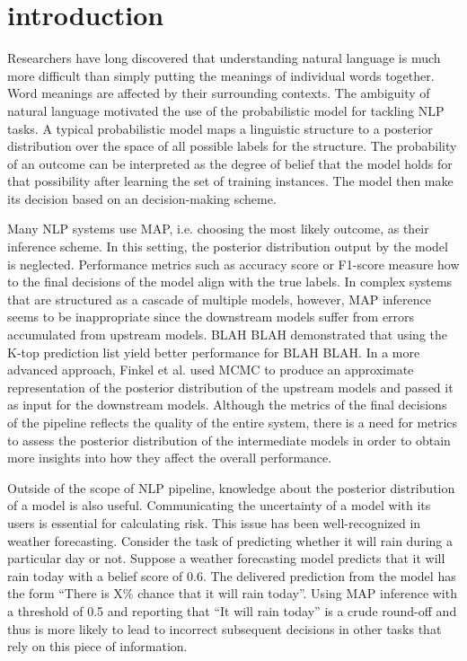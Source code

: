 \chapter{introduction}
\doublespacenormalsize
Researchers have long discovered that understanding natural language is much more difficult than simply putting the meanings of individual words together. Word meanings are affected by their surrounding contexts. The ambiguity of natural language motivated the use of the probabilistic model for tackling NLP tasks. A typical probabilistic model maps a linguistic structure to a posterior distribution over the space of all possible labels for the structure. The probability of an outcome can be interpreted as the degree of belief that the model holds for that possibility after learning the set of training instances. The model then make its decision based on an decision-making scheme. 

Many NLP systems use MAP, i.e. choosing the most likely outcome, as their inference scheme. In this setting, the posterior distribution output by the model is neglected. Performance metrics such as accuracy score or F1-score measure how to the final decisions of the model align with the true labels. In complex systems that are structured as a cascade of multiple models, however, MAP inference seems to be inappropriate since the downstream models suffer from errors accumulated from upstream models. BLAH BLAH demonstrated that using the K-top prediction list yield better performance for BLAH BLAH. In a more advanced approach, Finkel et al. used MCMC to produce an approximate representation of the posterior distribution of the upstream models and passed it as input for the downstream models. Although the metrics of the final decisions of the pipeline reflects the quality of the entire system, there is a need for metrics to assess the posterior distribution of the intermediate models in order to obtain more insights into how they affect the overall performance. 

Outside of the scope of NLP pipeline, knowledge about the posterior distribution of a model is also useful. Communicating the uncertainty of a model with its users is essential for calculating risk. This issue has been well-recognized in weather forecasting. Consider the task of predicting whether it will rain during a particular day or not. Suppose a weather forecasting model predicts that it will rain today with a belief score of 0.6. The delivered prediction from the model has the form “There is X\% chance that it will rain today”. Using MAP inference with a threshold of 0.5 and reporting that “It will rain today” is a crude round-off and thus is more likely to lead to incorrect subsequent decisions in other tasks that rely on this piece of information. 

